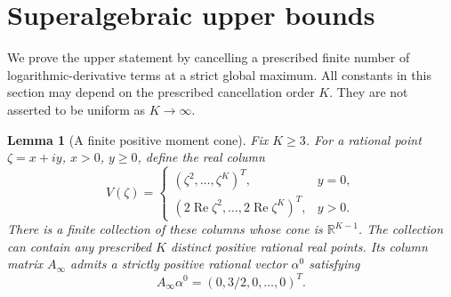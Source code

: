 \documentclass[11pt]{article}
\newtheorem{lemma}[theorem]{Lemma}
\theoremstyle{remark}\newtheorem{remark}[theorem]{Remark}
\newcommand{\Rea}{\operatorname{Re}}
\begin{document}
\section{Superalgebraic upper bounds}\label{sec:upper}
We prove the upper statement by cancelling a prescribed finite number of
logarithmic-derivative terms at a strict global maximum. All constants in
this section may depend on the prescribed cancellation order \(K\).
They are not asserted to be uniform as \(K\to\infty\).

\begin{lemma}[A finite positive moment cone]\label{lem:cone}
Fix \(K\ge3\). For a rational point \(\zeta=x+iy\), \(x>0\), \(y\ge0\),
define the real column
\[
 V(\zeta)=
 \begin{cases}
  (\zeta^2,\ldots,\zeta^K)^T,&y=0,\\
  (2\Rea\zeta^2,\ldots,2\Rea\zeta^K)^T,&y>0.
 \end{cases}
\]
There is a finite collection of these columns whose cone is
\(\mathbb R^{K-1}\). The collection can contain any prescribed \(K\)
distinct positive rational real points. Its column matrix \(A_\infty\)
admits a strictly positive rational vector \(\alpha^0\) satisfying
\[
 A_\infty\alpha^0=(0,3/2,0,\ldots,0)^T.
\]
\end{lemma}
\end{document}
